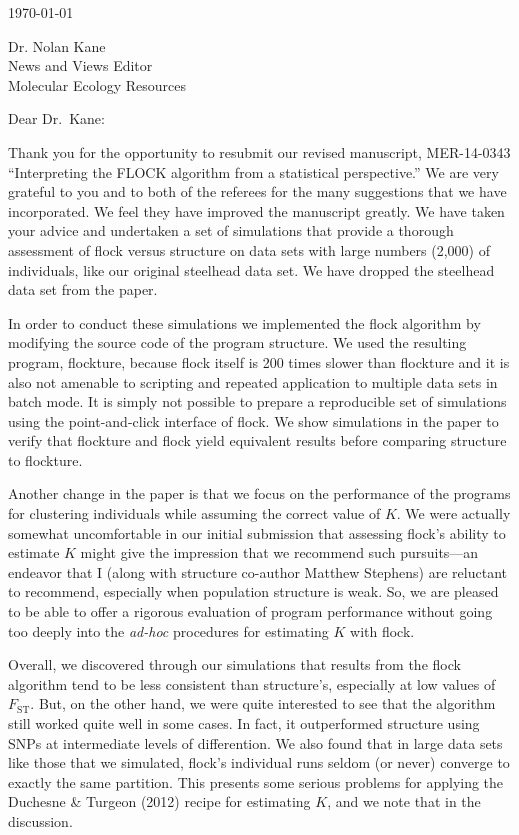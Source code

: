 \documentclass[11pt]{letter}
\date{}
\begin{document}
\begin{letter}{ \today 

Dr. Nolan Kane\\
News and Views Editor\\
Molecular Ecology Resources \\
}

\opening{Dear Dr.~Kane:}

Thank you for the opportunity to resubmit our revised manuscript, MER-14-0343 ``Interpreting the FLOCK algorithm
from a statistical perspective.''  We are very grateful to you and to both of the referees for the many
suggestions that we have incorporated.  We feel they have improved the manuscript greatly.  We have taken your
advice and undertaken a set of simulations that provide a thorough assessment of {\sc flock} versus {\sc 
structure} on data sets with large numbers (2,000) of individuals, like our original steelhead data set.
We have dropped the steelhead data set from the paper.  

In order to conduct these simulations we implemented the {\sc flock} algorithm by modifying the source code of
the program {\sc structure}.  We used the resulting program, {\sc flockture}, because {\sc flock} itself
is 200 times slower than {\sc flockture} and it is also not amenable to scripting and repeated application to 
multiple data sets in batch mode.  It is simply not possible to prepare a reproducible set of simulations using
the point-and-click interface of {\sc flock}.  We show simulations in the paper to verify that {\sc flockture} and {\sc flock} yield equivalent results before comparing {\sc structure} to {\sc flockture}.

Another change in the paper is that we focus on the performance of the programs for clustering individuals while
assuming the correct value of $K$.  We were actually somewhat uncomfortable in our initial submission that
assessing {\sc flock}'s ability to estimate $K$ might give the impression that we recommend such pursuits---an
endeavor that I (along with {\sc structure} co-author Matthew Stephens) are reluctant to recommend, especially
when population structure is weak.  So, we are pleased to be able to offer a rigorous evaluation of program
performance without going too deeply into the {\em ad-hoc} procedures for estimating $K$ with {\sc flock}.

Overall, we discovered through our simulations that results from the {\sc flock} algorithm tend to be less 
consistent than {\sc structure}'s, especially at low values of $F_\mathrm{ST}$.  But, on the other hand, we were 
quite interested to see that the algorithm still worked quite well in some cases.  In fact, it outperformed {\sc structure} 
using SNPs at intermediate levels of differention.  We also found that in large data sets like those that
we simulated, {\sc flock}'s individual runs seldom (or never) converge to exactly the same partition.  This 
presents some serious problems for applying the Duchesne \& Turgeon (2012) recipe for estimating $K$, and we 
note that in the discussion.  


\end{letter}
\end{document}
